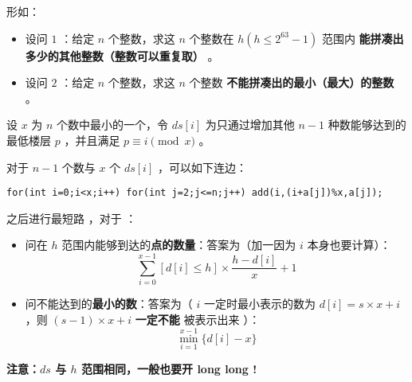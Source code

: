 形如：
\begin{itemize}
    \item 设问 $1$ ：给定 $n$ 个整数，求这 $n$ 个整数在 $h(h\le2^{63}-1)$ 范围内 \textbf{能拼凑出多少的其他整数（整数可以重复取）} 。
    \item 设问 $2$ ：给定 $n$ 个整数，求这 $n$ 个整数 \textbf{不能拼凑出的最小（最大）的整数} 。
\end{itemize}

设 $x$ 为 $n$ 个数中最小的一个，令 $ds[i]$ 为只通过增加其他 $n-1$ 种数能够达到的最低楼层 $p$ ，并且满足 $p\equiv i\pmod{x}$ 。

对于 $n-1$ 个数与 $x$ 个 $ds[i]$ ，可以如下连边：

\begin{verbatim}
for(int i=0;i<x;i++) for(int j=2;j<=n;j++) add(i,(i+a[j])%x,a[j]); 
\end{verbatim}

之后进行最短路 ，对于 ：

\begin{itemize}
    \item 问在 $h$ 范围内能够到达的\textbf{点的数量}：答案为（加一因为 $i$ 本身也要计算）：
    $$
        \sum_{i=0}^{x-1}{[d[i]\le h]\times\frac{h-d[i]}{x}+1}
    $$
    \item 问不能达到的\textbf{最小的数}：答案为（ $i$ 一定时最小表示的数为 $d[i]=s\times x+i$ ，则 $(s-1)\times x+i$  \textbf{一定不能} 被表示出来 ）：
    $$
        \min_{i=1}^{x-1}{\{d[i]-x\}}
    $$
\end{itemize}

\textbf{注意：$ds$ 与 $h$ 范围相同，一般也要开 long long !}